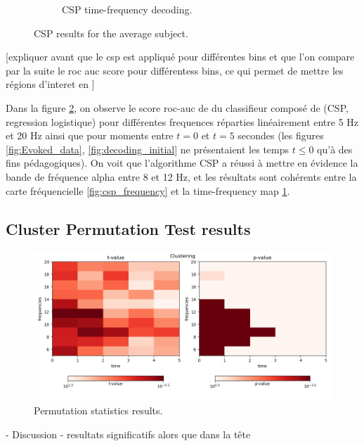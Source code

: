 \begin{figure}
\begin{subfigure}{.5\textwidth}
        \caption{CSP time-frequency decoding.}
        \label{fig:csp_time_frequency}
    \end{subfigure}
    \caption{CSP results for the average subject.}
    \label{fig:csp_results}
\end{figure}


[expliquer avant que le csp est appliqué pour différentes bins et que l'on compare par la suite le roc auc score pour différentess bins, ce qui permet de mettre les régions d'interet en ]

Dans la figure \ref{fig:csp_results}, on observe le score roc-auc de du classifieur composé de (CSP, regression logistique) pour différentes frequences réparties linéairement entre 5 Hz et 20 Hz ainsi que pour moments entre $t=0$ et $t=5$ secondes (les figures \ref{fig:Evoked_data}, \ref{fig:decoding_initial} ne présentaient les temps $t \leq 0$ qu'à des fins pédagogiques). On voit que l'algorithme CSP a réussi à mettre en évidence la bande de fréquence alpha entre 8 et 12 Hz, et les résultats sont cohérents entre la carte fréquencielle \ref{fig:csp_frequency} et la time-frequency map \ref{fig:csp_time_frequency}.




\subsection{Cluster Permutation Test results}

\begin{figure}[ht]
    \centering
    \includegraphics[width=15cm]{images_report/sensor/csp_permutation_res/permutations_test.png}
    \caption[Permutation statistics results.]%
    {Permutation statistics results.}
    \label{permutation_statistics_results}
\end{figure}

- Discussion
- resultats significatifs alors que dans la tête

